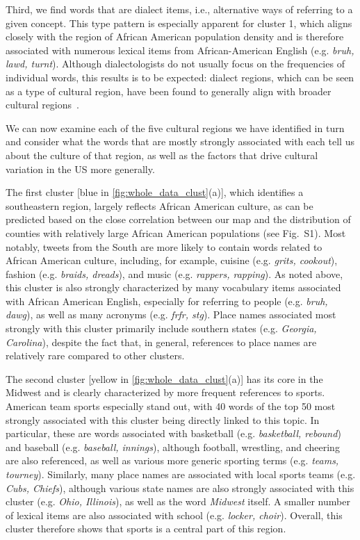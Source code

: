 \documentclass[../thesis.tex]{subfiles}
\begin{document}
Third, we find words that are dialect items, i.e., alternative ways of referring to a
given concept. This type pattern is especially apparent for cluster 1, which aligns
closely with the region of African American population density and is therefore
associated with numerous lexical items from African-American English (e.g. \textit{bruh,
lawd, turnt}). Although dialectologists do not usually focus on the frequencies of
individual words, this results is to be expected: dialect regions, which can be seen as
a type of cultural region, have been found to generally align with broader cultural
regions~\cite{GrieveRegionalVariation2016}.

We can now examine each of the five cultural regions we have identified in turn and
consider what the words that are mostly strongly associated with each tell us about the
culture of that region, as well as the factors that drive cultural variation in the US
more generally. 

The first cluster [blue in \cref{fig:whole_data_clust}(a)], which identifies a
southeastern region, largely reflects African American culture, as can be predicted
based on the close correlation between our map and the distribution of counties with
relatively large African American populations (see Fig.~S1). Most notably, tweets from
the South are more likely to contain words related to African American culture,
including, for example, cuisine (e.g. \textit{grits, cookout}), fashion (e.g.
\textit{braids, dreads}), and music (e.g. \textit{rappers, rapping}). As noted above,
this cluster is also strongly characterized by many vocabulary items associated with
African American English, especially for referring to people (e.g. \textit{bruh, dawg}),
as well as many acronyms (e.g. \textit{frfr, stg}). Place names associated most strongly
with this cluster primarily include southern states (e.g. \textit{Georgia, Carolina}),
despite the fact that, in general, references to place names are relatively rare
compared to other clusters.

The second cluster [yellow in \cref{fig:whole_data_clust}(a)] has its core in the
Midwest and is clearly characterized by more frequent references to sports. American
team sports especially stand out, with 40 words of the top 50 most strongly associated
with this cluster being directly linked to this topic. In particular, these are words
associated with basketball (e.g. \textit{basketball, rebound}) and baseball (e.g.
\textit{baseball, innings}), although football, wrestling, and cheering are also
referenced, as well as various more generic sporting terms (e.g. \textit{teams,
tourney}). Similarly, many place names are associated with local sports teams (e.g.
\textit{Cubs, Chiefs}), although various state names are also strongly associated with
this cluster (e.g. \textit{Ohio, Illinois}), as well as the word \textit{Midwest}
itself.  A smaller number of lexical items are also associated with school (e.g.
\textit{locker, choir}). Overall, this cluster therefore shows that sports is a central
part of this region. 
\end{document}
